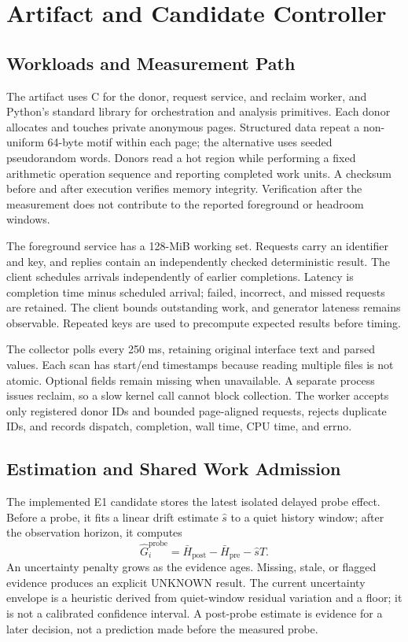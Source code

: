 \documentclass[conference]{IEEEtran}
\begin{document}
\section{Artifact and Candidate Controller}
\subsection{Workloads and Measurement Path}
The artifact uses C for the donor, request service, and reclaim worker, and
Python's standard library for orchestration and analysis primitives. Each donor
allocates and touches private anonymous pages. Structured data repeat a
non-uniform 64-byte motif within each page; the alternative uses seeded
pseudorandom words. Donors read a hot region while performing a fixed arithmetic
operation sequence and reporting completed work units. A checksum before and
after execution verifies memory integrity. Verification after the measurement
does not contribute to the reported foreground or headroom windows.

The foreground service has a 128-MiB working set. Requests carry an identifier
and key, and replies contain an independently checked deterministic result.
The client schedules arrivals independently of earlier completions. Latency is
completion time minus scheduled arrival; failed, incorrect, and missed requests
are retained. The client bounds outstanding work, and generator lateness remains
observable. Repeated keys are used to precompute expected results before timing.

The collector polls every 250 ms, retaining original interface text and parsed
values. Each scan has start/end timestamps because reading multiple files is
not atomic. Optional fields remain missing when unavailable. A separate process
issues reclaim, so a slow kernel call cannot block collection. The worker accepts
only registered donor IDs and bounded page-aligned requests, rejects duplicate
IDs, and records dispatch, completion, wall time, CPU time, and errno.

\subsection{Estimation and Shared Work Admission}
The implemented E1 candidate stores the latest isolated delayed probe effect.
Before a probe, it fits a linear drift estimate $\hat s$ to a quiet history
window; after the observation horizon, it computes
\begin{equation}
\widehat{G}^{\mathrm{probe}}_i=
\bar H_{\mathrm{post}}-\bar H_{\mathrm{pre}}-\hat sT.
\end{equation}
An uncertainty penalty grows as the evidence ages. Missing, stale, or flagged
evidence produces an explicit UNKNOWN result. The current uncertainty envelope
is a heuristic derived from quiet-window residual variation and a floor; it is
not a calibrated confidence interval. A post-probe estimate is evidence for a
later decision, not a prediction made before the measured probe.
\end{document}
